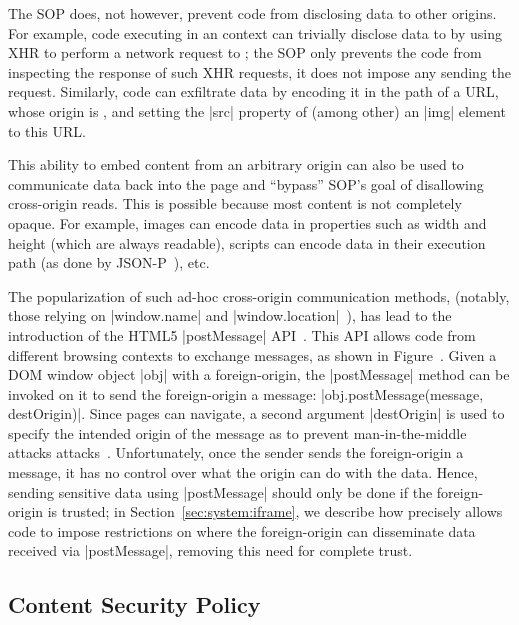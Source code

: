 The SOP does, not however, prevent code from disclosing data to other
origins.
%
For example, code executing in an  context can trivially
disclose data to  by using XHR to perform a network
request to ; the SOP only prevents the code from
inspecting the response of such XHR requests, it does not impose any
sending the request.
%
Similarly, code can exfiltrate data by encoding it in the path of a
URL, whose origin is , and setting the \js|src| property
of (among other) an \js|img| element to this URL.

This ability to embed content from an arbitrary origin can also be
used to communicate data back into the page and ``bypass'' SOP's goal
of disallowing cross-origin reads.
%
This is possible because most content is not completely opaque. 
%
For example, images can encode data in properties such as width and
height (which are always readable), scripts can encode data in their
execution path (as done by JSON-P~), etc.
%

The popularization of such ad-hoc cross-origin communication methods,
(notably, those relying on \js|window.name| and
\js|window.location|~), has lead to the
introduction of the HTML5 \js|postMessage| API~.
%
This API allows code from different browsing contexts to exchange
messages, as shown in Figure~.
%
Given a DOM window object \js|obj| with a foreign-origin, the
\js|postMessage| method can be invoked on it to send the
foreign-origin a message: \js|obj.postMessage(message, destOrigin)|.
%
Since pages can navigate, a second argument \js|destOrigin| is used to
specify the intended origin of the message as to prevent
man-in-the-middle attacks attacks~.
%
Unfortunately, once the sender sends the foreign-origin a message, it
has no control over what the origin can do with the data.
%
Hence, sending sensitive data using \js|postMessage| should only be
done if the foreign-origin is trusted;
%
in Section~\ref{sec:system:iframe}, we describe how \sys{} precisely
allows code to impose restrictions on where the foreign-origin can
disseminate data received via \js|postMessage|, removing this need for
complete trust.

\subsection{Content Security Policy} 
\label{sec:background:csp}


